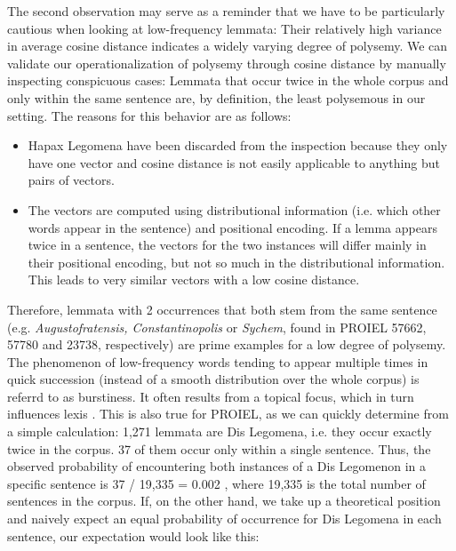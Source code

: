 \documentclass[oneside]{book}
\begin{document}
The second observation may serve as a reminder that we have to be particularly cautious when looking at low-frequency lemmata: Their relatively high variance in average cosine distance indicates a widely varying degree of polysemy. We can validate our operationalization of polysemy through cosine distance by manually inspecting conspicuous cases: Lemmata that occur twice in the whole corpus and only within the same sentence are, by definition, the least polysemous in our setting. The reasons for this behavior are as follows:
\begin{itemize}
	\item Hapax Legomena have been discarded from the inspection because they only have one vector and cosine distance is not easily applicable to anything but pairs of vectors.
	\item The vectors are computed using distributional information (i.e. which other words appear in the sentence) and positional encoding. If a lemma appears twice in a sentence, the vectors for the two instances will differ mainly in their positional encoding, but not so much in the distributional information. This leads to very similar vectors with a low cosine distance.
\end{itemize}
Therefore, lemmata with 2 occurrences that both stem from the same sentence (e.g. \textit{Augustofratensis, Constantinopolis} or \textit{Sychem}, found in PROIEL 57662, 57780 and 23738, respectively) are prime examples for a low degree of polysemy. The phenomenon of low-frequency words tending to appear multiple times in quick succession (instead of a smooth distribution over the whole corpus) is referrd to as burstiness. It often results from a topical focus, which in turn influences lexis \parencite[99]{pierrehumbertBurstinessVerbsDerived2012}. This is also true for PROIEL, as we can quickly determine from a simple calculation: 1,271 lemmata are Dis Legomena, i.e. they occur exactly twice in the corpus. 37 of them occur only within a single sentence. Thus, the observed probability of encountering both instances of a Dis Legomenon in a specific sentence is 37 / 19,335 = 0.002 , where 19,335 is the total number of sentences in the corpus. If, on the other hand, we take up a theoretical position and naively expect an equal probability of occurrence for Dis Legomena in each sentence, our expectation would look like this:
\end{document}
